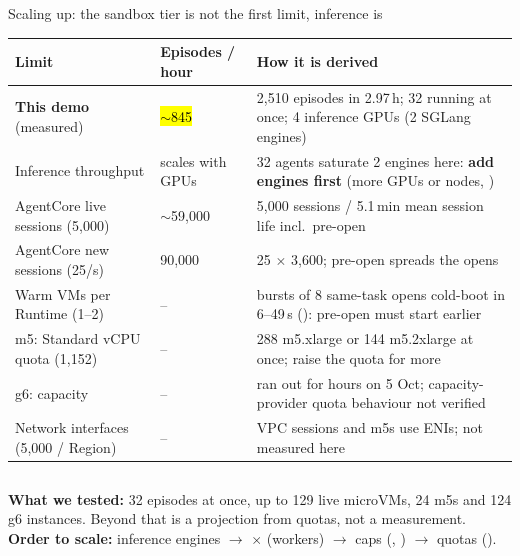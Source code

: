 \begin{frame}{Scaling up: the sandbox tier is not the first limit, inference is}
\tiny\setlength{\tabcolsep}{3pt}
\begin{tabularx}{\textwidth}{@{}P{0.27\textwidth}P{0.18\textwidth}Y@{}}
\toprule
\textbf{Limit} & \textbf{Episodes / hour} & \textbf{How it is derived}\\
\midrule
\textbf{This demo} (measured) & \hl{$\sim$845} & 2{,}510 episodes in 2.97\,h; 32 running at once; 4 inference GPUs (2 SGLang engines)\\
Inference throughput & scales with GPUs & 32 agents saturate 2 engines here: \textbf{add engines first} (more GPUs or nodes, )\\
AgentCore live sessions (5{,}000) & $\sim$59{,}000 & 5{,}000 sessions / 5.1\,min mean session life incl.\ pre-open\\
AgentCore new sessions (25/s) & 90{,}000 & 25 $\times$ 3{,}600; pre-open spreads the opens\\
Warm VMs per Runtime (1--2) & -- & bursts of 8 same-task opens cold-boot in 6--49\,s (): pre-open must start earlier\\
m5: Standard vCPU quota (1{,}152) & -- & 288 m5.xlarge or 144 m5.2xlarge at once; raise the quota for more\\
g6: capacity & -- & ran out for hours on 5 Oct; capacity-provider quota behaviour not verified\\
Network interfaces (5{,}000 / Region) & -- & VPC sessions and m5s use ENIs; not measured here\\
\bottomrule
\end{tabularx}
\par\vspace{2mm}
\begin{columns}[T]
\scriptsize\textbf{What we tested:} 32 episodes at once, up to 129 live microVMs, 24 m5s and 124 g6 instances. Beyond that is a projection from quotas, not a measurement.
\scriptsize\textbf{Order to scale:} inference engines $\rightarrow$ $\times$ (workers) $\rightarrow$ caps (, ) $\rightarrow$ quotas ().
\end{columns}
\end{frame}

